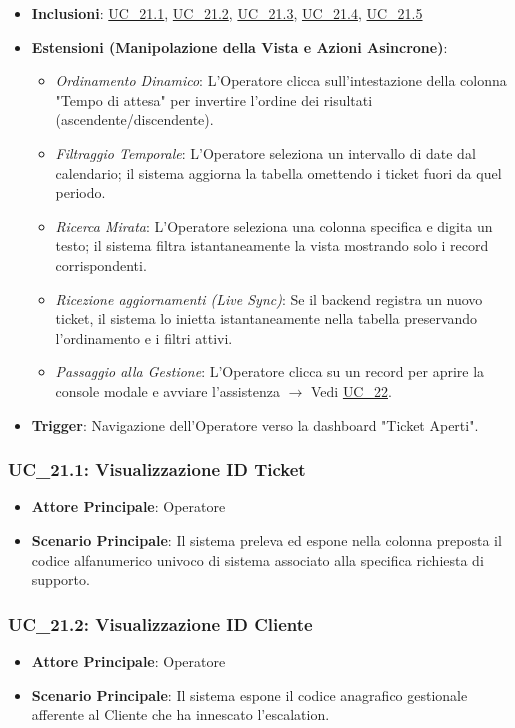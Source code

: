 \begin{itemize}
    \item \textbf{Inclusioni}: \hyperref[uc_21.1]{UC\_21.1}, \hyperref[uc_21.2]{UC\_21.2}, \hyperref[uc_21.3]{UC\_21.3}, \hyperref[uc_21.4]{UC\_21.4}, \hyperref[uc_21.5]{UC\_21.5}
    \item \textbf{Estensioni (Manipolazione della Vista e Azioni Asincrone)}:
    \begin{itemize}
        \item \textit{Ordinamento Dinamico}: L'Operatore clicca sull'intestazione della colonna "Tempo di attesa" per invertire l'ordine dei risultati (ascendente/discendente).
        \item \textit{Filtraggio Temporale}: L'Operatore seleziona un intervallo di date dal calendario; il sistema aggiorna la tabella omettendo i ticket fuori da quel periodo.
        \item \textit{Ricerca Mirata}: L'Operatore seleziona una colonna specifica e digita un testo; il sistema filtra istantaneamente la vista mostrando solo i record corrispondenti.
        \item \textit{Ricezione aggiornamenti (Live Sync)}: Se il backend registra un nuovo ticket, il sistema lo inietta istantaneamente nella tabella preservando l'ordinamento e i filtri attivi.
        \item \textit{Passaggio alla Gestione}: L'Operatore clicca su un record per aprire la console modale e avviare l'assistenza $\rightarrow$ Vedi \hyperref[uc_22]{UC\_22}.
    \end{itemize}
    \item \textbf{Trigger}: Navigazione dell'Operatore verso la dashboard "Ticket Aperti".
\end{itemize}

\subsubsection{UC\_21.1: Visualizzazione ID Ticket}
\label{uc_21.1}
\begin{itemize}
    \item \textbf{Attore Principale}: Operatore
    \item \textbf{Scenario Principale}: Il sistema preleva ed espone nella colonna preposta il codice alfanumerico univoco di sistema associato alla specifica richiesta di supporto.
\end{itemize}

\subsubsection{UC\_21.2: Visualizzazione ID Cliente}
\label{uc_21.2}
\begin{itemize}
    \item \textbf{Attore Principale}: Operatore
    \item \textbf{Scenario Principale}: Il sistema espone il codice anagrafico gestionale afferente al Cliente che ha innescato l'escalation.
\end{itemize}


